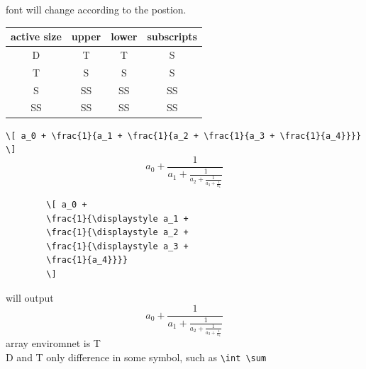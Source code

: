 \documentclass[a4paper,12pt,twoside]{book}
\begin{document}
		font will change according to the postion. \\
		\begin{tabular}{|c|c|c|c|}
		\hline active size & upper & lower & subscripts\\
		\hline D & T & T & S\\
		\hline T & S & S & S\\
		\hline S & SS & SS & SS\\
		\hline SS & SS & SS & SS\\
		\hline
		\end{tabular}

		\verb=\[ a_0 + \frac{1}{a_1 + \frac{1}{a_2 + \frac{1}{a_3 + \frac{1}{a_4}}}} \]=
		\[ a_0 + \frac{1}{a_1 + \frac{1}{a_2 + \frac{1}{a_3 + \frac{1}{a_4}}}} \]

		\begin{verbatim}
		\[ a_0 +
		\frac{1}{\displaystyle a_1 +
		\frac{1}{\displaystyle a_2 +
		\frac{1}{\displaystyle a_3 +
		\frac{1}{a_4}}}}
		\]
		\end{verbatim}
		will output
		\[ a_0 +
		\frac{1}{\displaystyle a_1 +
		\frac{1}{\displaystyle a_2 +
		\frac{1}{\displaystyle a_3 +
		\frac{1}{a_4}}}}
		\]
		array enviromnet is T \\
		D and T only difference in some symbol, such as \verb=\int \sum= \\
\end{document}
